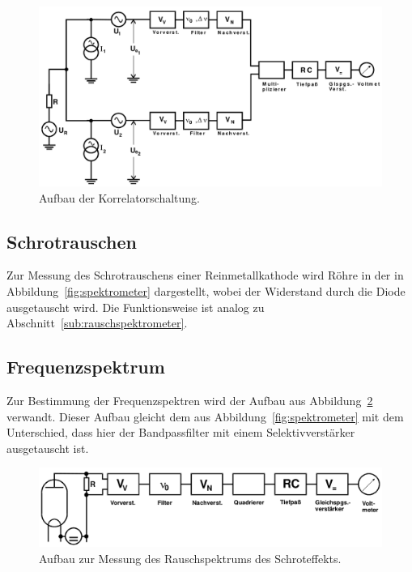 \begin{figure}[htpb]
  \centering
  \includegraphics[scale=0.3]{bilder/korrelator.png}
  \caption{Aufbau der Korrelatorschaltung.}
\label{fig:korrelator}
\end{figure}

\subsection{Schrotrauschen}
\label{sub:schrotrauschen}

Zur Messung des Schrotrauschens einer Reinmetallkathode wird Röhre in der in
Abbildung~\ref{fig:spektrometer} dargestellt, wobei der Widerstand durch die
Diode ausgetauscht wird.
Die Funktionsweise ist analog zu Abschnitt~\ref{sub:rauschspektrometer}.

\subsection{Frequenzspektrum}
\label{sub:frequenzspektrum}

Zur Bestimmung der Frequenzspektren wird der Aufbau aus
Abbildung~\ref{fig:schrot} verwandt. Dieser Aufbau gleicht dem aus
Abbildung~\ref{fig:spektrometer} mit dem Unterschied, dass hier der
Bandpassfilter mit einem Selektivverstärker ausgetauscht ist.

\begin{figure}[htpb]
  \centering
  \includegraphics[scale=0.3]{bilder/schrot.png}
  \caption{Aufbau zur Messung des Rauschspektrums des Schroteffekts.}
\label{fig:schrot}
\end{figure}
